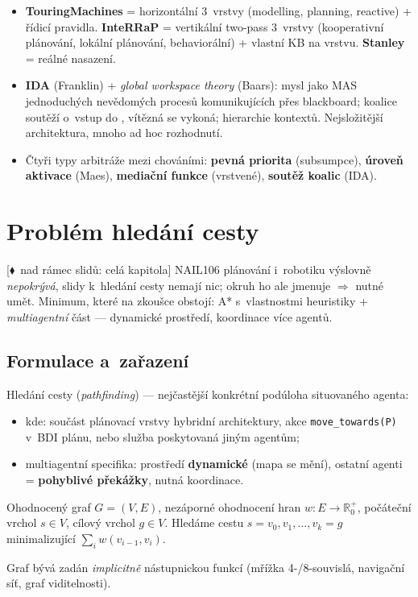 \documentclass[11pt,a4paper]{article}
\theoremstyle{definition}
\newcommand{\mimoq}[1]{\textcolor{markcol}{\textsf{\footnotesize[$\blacklozenge$~nad rámec slidů: #1]}}}
\begin{document}
\begin{itemize}
  vs.\ vertikální (sériové, one-pass/two-pass, $n-1$ rozhraní, křehké).
\item \textbf{TouringMachines} = horizontální 3~vrstvy (modelling, planning, reactive) + řídicí
  pravidla. \textbf{InteRRaP} = vertikální two-pass 3~vrstvy (kooperativní plánování, lokální
  plánování, behaviorální) + vlastní KB na vrstvu. \textbf{Stanley} = reálné nasazení.
\item \textbf{IDA} (Franklin) + \emph{global workspace theory} (Baars): mysl jako MAS
  jednoduchých nevědomých procesů komunikujících přes blackboard; koalice soutěží o~vstup do
  , vítězná se vykoná; hierarchie kontextů. Nejsložitější architektura, mnoho
  ad hoc rozhodnutí.
\item Čtyři typy arbitráže mezi chováními: \textbf{pevná priorita} (subsumpce),
  \textbf{úroveň aktivace} (Maes), \textbf{mediační funkce} (vrstvené), \textbf{soutěž koalic}
  (IDA).
\end{itemize}
\section{Problém hledání cesty}
\label{sec:cesta}

\noindent\mimoq{celá kapitola} NAIL106 plánování i~robotiku výslovně \emph{nepokrývá}, slidy
k~hledání cesty nemají nic; okruh ho ale jmenuje $\Rightarrow$ nutné umět. Minimum, které na
zkoušce obstojí: A* s~vlastnostmi heuristiky + \emph{multiagentní} část --- dynamické prostředí,
koordinace více agentů.

\subsection{Formulace a~zařazení}

Hledání cesty (\emph{pathfinding}) --- nejčastější konkrétní podúloha situovaného agenta:
\begin{itemize}
\item kde: součást plánovací vrstvy hybridní architektury, akce \texttt{move\_towards(P)}
  v~BDI plánu, nebo služba poskytovaná jiným agentům;
\item multiagentní specifika: prostředí \textbf{dynamické} (mapa se mění), ostatní agenti =
  \textbf{pohyblivé překážky}, nutná koordinace.
\end{itemize}

\begin{defbox}
Ohodnocený graf $G = (V,E)$, nezáporné ohodnocení hran $w : E \to \mathbb{R}_0^+$, počáteční
vrchol $s \in V$, cílový vrchol $g \in V$. Hledáme cestu $s = v_0, v_1, \dots, v_k = g$
minimalizující $\sum_{i} w(v_{i-1},v_i)$.

Graf bývá zadán \emph{implicitně} nástupnickou funkcí (mřížka 4-/8-souvislá, navigační síť,
graf viditelnosti).
\end{defbox}
\end{document}
